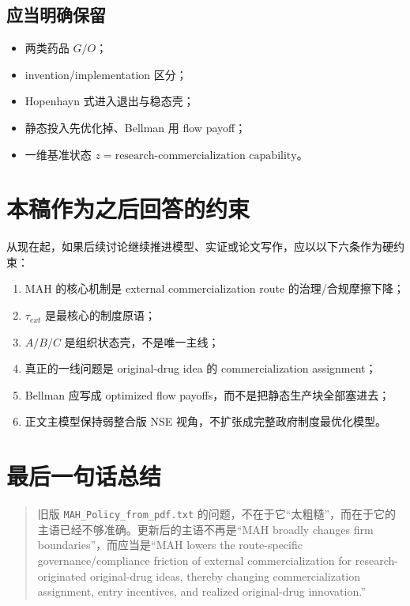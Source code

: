 \documentclass[12pt,fontset=none]{ctexart}
\begin{document}
\subsection{应当明确保留}
\begin{itemize}
    \item 两类药品 $G/O$；
    \item invention/implementation 区分；
    \item Hopenhayn 式进入退出与稳态壳；
    \item 静态投入先优化掉、Bellman 用 flow payoff；
    \item 一维基准状态 $z = \text{research-commercialization capability}$。
\end{itemize}

\section{本稿作为之后回答的约束}

从现在起，如果后续讨论继续推进模型、实证或论文写作，应以以下六条作为硬约束：
\begin{enumerate}
    \item MAH 的核心机制是 external commercialization route 的治理/合规摩擦下降；
    \item $\tau_{ext}$ 是最核心的制度原语；
    \item $A/B/C$ 是组织状态壳，不是唯一主线；
    \item 真正的一线问题是 original-drug idea 的 commercialization assignment；
    \item Bellman 应写成 optimized flow payoffs，而不是把静态生产块全部塞进去；
    \item 正文主模型保持弱整合版 NSE 视角，不扩张成完整政府制度最优化模型。
\end{enumerate}

\section{最后一句话总结}

\begin{quote}
旧版 \texttt{MAH\_Policy\_from\_pdf.txt} 的问题，不在于它“太粗糙”，而在于它的主语已经不够准确。更新后的主语不再是“MAH broadly changes firm boundaries”，而应当是“MAH lowers the route-specific governance/compliance friction of external commercialization for research-originated original-drug ideas, thereby changing commercialization assignment, entry incentives, and realized original-drug innovation.”
\end{quote}
\end{document}
